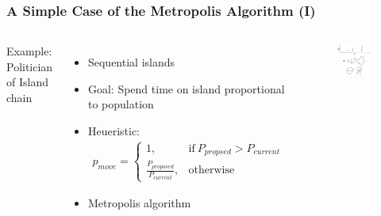 \documentclass[usenames,dvipsnames,table]{beamer}
\begin{document}
\begin{frame}
\frametitle{A Simple Case of the Metropolis Algorithm (I)}
\begin{columns}[c]
Example: Politician of Island chain
\begin{itemize}
\item Sequential islands
\item Goal: Spend time on island proportional to population
\item Heueristic:
    \begin{align*}
        p_{move} =
            \begin{cases}
            1,                               & \mathrm{if\ } P_{propsed} > P_{current}\\
            \frac{P_{proposed}}{P_{current}},& \mathrm{otherwise}
            \end{cases}
    \end{align*}
\item Metropolis algorithm
\end{itemize}
\begin{figure}
\centering
\includegraphics[height=0.4\textheight]{img/experiment-setup}
\end{figure}
\end{columns}
\end{frame}
\end{document}

